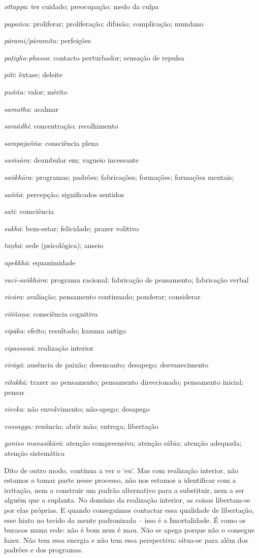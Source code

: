 {  \emph{ottappa}: ter cuidado; preocupação; medo da culpa

  \emph{papañca:} proliferar; proliferação; difusão; complicação; mundano

  \emph{pārami/pāramita:} perfeições

  \emph{paṭigha-phassa}: contacto perturbador; sensação de repulsa

  \emph{pīti}: êxtase; deleite

  \emph{puñña:} valor; mérito

  \emph{samatha}: acalmar

  \emph{samādhi}: concentração; recolhimento

  \emph{sampajañña}: consciência plena

  \emph{saṁsāra:} deambular em; vagueio incessante

  \emph{saṅkhāra:} programas; padrões; fabricações; formações; formações mentais;

  \emph{saññā}: percepção; significados sentidos

  \emph{sati}: consciência

  \emph{sukhā}: bem-estar; felicidade; prazer volitivo

  \emph{taṇhā}: sede (psicológica); anseio

  \emph{upekkhā}: equanimidade

  \emph{vacī-saṅkhāra}: programa racional; fabricação de pensamento; fabricação verbal

  \emph{vicāra}: avaliação; pensamento continuado; ponderar; considerar

  \emph{viññaṇa}: consciência cognitiva

  \emph{vipāka}: efeito; resultado; kamma antigo

  \emph{vipassanā}: realização interior

  \emph{virāgā}: ausência de paixão; desencanto; desapego; desvanecimento

  \emph{vitakkā:} trazer ao pensamento; pensamento direccionado; pensamento inicial; pensar

  \emph{viveka}: não envolvimento; não-apego; desapego

  \emph{vossagga:} renúncia; abrir mão; entrega; libertação

  \emph{yoniso manasikārā}: atenção compreensiva; atenção sábia; atenção adequada; atenção sistemática} Dito de outro modo, continua a ver o `eu'. Mas com realização interior, não estamos a tomar parte nesse processo, não nos estamos a identificar com a irritação, nem a construir um padrão alternativo para a substituir, nem a ser alguém que a suplanta. No domínio da realização interior, as coisas libertam-se por elas próprias. E quando conseguimos contactar essa qualidade de libertação, esse hiato no tecido da mente padronizada -- isso é a Imortalidade. É como os buracos numa rede: não é bom nem é mau. Não se apega porque não o consegue fazer. Não tem essa energia e não tem essa perspectiva: situa-se para além dos padrões e dos programas.

